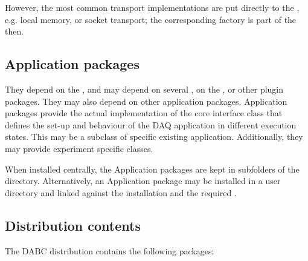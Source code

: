    However, the most common transport implementations are put 
   directly to the , e.g. local memory, or 
   socket transport; the corresponding factory is part of the  then. 
 
\subsection{Application packages}
They depend on the , and may depend 
on several , on the , or other plugin packages. 
They may also depend on other application packages. 
Application packages provide the actual implementation of the core interface class
 that defines the set-up and behaviour of the DAQ application in 
different execution states. This may be a subclass of specific existing 
application. 
Additionally, they may provide experiment specific  classes.

When installed centrally, the Application packages are kept in subfolders of the 
 directory. Alternatively, an Application package may be installed in a user directory and linked against the  installation and the required .

\subsection{Distribution contents}
The DABC distribution contains the following packages:

